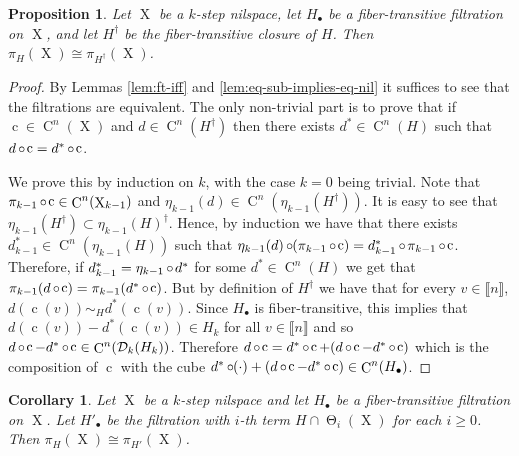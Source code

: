 \documentclass[a4paper,12pt,reqno]{amsart}
\newcommand*{\compl}[1]{#1^\dagger}
\newtheorem{corollary}[theorem]{Corollary}
\newtheorem{proposition}[theorem]{Proposition}
\theoremstyle{definition}
\newcommand*{\db}[1]{\llbracket #1\rrbracket}
\newcommand{\mc}{\mathcal}
\DeclareMathOperator{\tran}{\Theta}
\DeclareMathOperator{\q}{c}
\DeclareMathOperator{\ns}{X}
\DeclareMathOperator{\co}{\circ\hspace{-0.02 cm}}
\DeclareMathOperator{\cu}{C}
\begin{document}
\begin{proposition}
Let $\ns$ be a $k$-step nilspace, let $H_\bullet$ be a fiber-transitive filtration on $\ns$, and let ${\compl{H}}$ be the fiber-transitive closure of $H$. Then $\pi_H(\ns) \cong \pi_{{\compl{H}}}(\ns)$.
\end{proposition}

\begin{proof}
By Lemmas \ref{lem:ft-iff} and \ref{lem:eq-sub-implies-eq-nil} it suffices to see that the filtrations are equivalent. The only non-trivial part is to prove that if $\q\in\cu^n(\ns)$ and $d\in\cu^n({\compl{H}})$ then there exists $d^*\in \cu^n(H)$ such that $d\co \q = d^*\co \q$.

We prove this by induction on $k$, with the case $k=0$ being trivial. Note that $\pi_{k-1}\co \q\in \cu^n(\ns_{k-1})$ and $\eta_{k-1}(d)\in\cu^n(\eta_{k-1}({\compl{H}}))$. It is easy to see that $\eta_{k-1}({\compl{H}})\subset \compl{\eta_{k-1}(H)}$. Hence, by induction we have that there exists $d_{k-1}^*\in \cu^n(\eta_{k-1}(H))$ such that $\eta_{k-1}(d) \co (\pi_{k-1}\co \q) = d_{k-1}^*\co \pi_{k-1}\co \q$. Therefore, if $d_{k-1}^* = \eta_{k-1}\co d^*$ for some $d^*\in \cu^n(H)$ we get that $\pi_{k-1}(d\co \q)=\pi_{k-1}(d^*\co \q)$. But by definition of ${\compl{H}}$ we have that for every $v\in \db{n}$, $d(\q(v))\sim_H d^*(\q(v))$. Since $H_\bullet$ is fiber-transitive, this implies that $d(\q(v))-d^*(\q(v))\in H_k$ for all $v\in \db{n}$ and so $d\co\q-d^*\co \q\in \cu^n(\mc{D}_k(H_k))$. Therefore $d\co \q = d^*\co \q+(d\co\q-d^*\co \q)$ which is the composition of $\q$ with the cube $d^*\co (\cdot)+(d\co\q-d^*\co \q)\in \cu^n(H_\bullet)$.
\end{proof}
\begin{corollary}\label{cor:equivalent-filtrations}
Let $\ns$ be a $k$-step nilspace and let $H_\bullet$ be a fiber-transitive filtration on $\ns$. Let $H'_\bullet$ be the filtration with $i$-th term $H\cap \tran_i(\ns)$ for each $i\geq 0$. Then $\pi_H(\ns)\cong \pi_{H'}(\ns)$.
\end{corollary}
\end{document}
